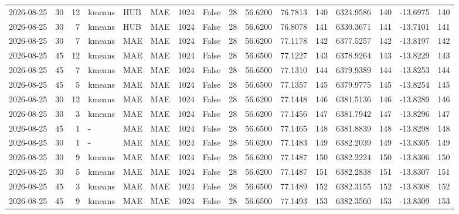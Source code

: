\documentclass[10pt]{article}
\begin{document}
\begin{landscape}
\begin{longtable}{@{}lrrlllrcrrrrrrrr@{}}
2026-08-25 & 30 & 12 & kmeans & HUB & MAE & 1024 & False & 28 & 56.6200 & 76.7813 & 140 & 6324.9586 & 140 & -13.6975 & 140 \\
2026-08-25 & 30 & 7 & kmeans & HUB & MAE & 1024 & False & 28 & 56.6200 & 76.8078 & 141 & 6330.3671 & 141 & -13.7101 & 141 \\
2026-08-25 & 30 & 7 & kmeans & MAE & MAE & 1024 & False & 28 & 56.6200 & 77.1178 & 142 & 6377.5257 & 142 & -13.8197 & 142 \\
2026-08-25 & 45 & 12 & kmeans & MAE & MAE & 1024 & False & 28 & 56.6500 & 77.1227 & 143 & 6378.9264 & 143 & -13.8229 & 143 \\
2026-08-25 & 45 & 7 & kmeans & MAE & MAE & 1024 & False & 28 & 56.6500 & 77.1310 & 144 & 6379.9389 & 144 & -13.8253 & 144 \\
2026-08-25 & 45 & 5 & kmeans & MAE & MAE & 1024 & False & 28 & 56.6500 & 77.1357 & 145 & 6379.9775 & 145 & -13.8254 & 145 \\
2026-08-25 & 30 & 12 & kmeans & MAE & MAE & 1024 & False & 28 & 56.6200 & 77.1448 & 146 & 6381.5136 & 146 & -13.8289 & 146 \\
2026-08-25 & 30 & 3 & kmeans & MAE & MAE & 1024 & False & 28 & 56.6200 & 77.1456 & 147 & 6381.7942 & 147 & -13.8296 & 147 \\
2026-08-25 & 45 & 1 & - & MAE & MAE & 1024 & False & 28 & 56.6500 & 77.1465 & 148 & 6381.8839 & 148 & -13.8298 & 148 \\
2026-08-25 & 30 & 1 & - & MAE & MAE & 1024 & False & 28 & 56.6200 & 77.1483 & 149 & 6382.2039 & 149 & -13.8305 & 149 \\
2026-08-25 & 30 & 9 & kmeans & MAE & MAE & 1024 & False & 28 & 56.6200 & 77.1487 & 150 & 6382.2224 & 150 & -13.8306 & 150 \\
2026-08-25 & 30 & 5 & kmeans & MAE & MAE & 1024 & False & 28 & 56.6200 & 77.1487 & 151 & 6382.2838 & 151 & -13.8307 & 151 \\
2026-08-25 & 45 & 3 & kmeans & MAE & MAE & 1024 & False & 28 & 56.6500 & 77.1489 & 152 & 6382.3155 & 152 & -13.8308 & 152 \\
2026-08-25 & 45 & 9 & kmeans & MAE & MAE & 1024 & False & 28 & 56.6500 & 77.1493 & 153 & 6382.3560 & 153 & -13.8309 & 153 \\
\bottomrule
\end{longtable}
\clearpage
\end{landscape}
\end{document}
